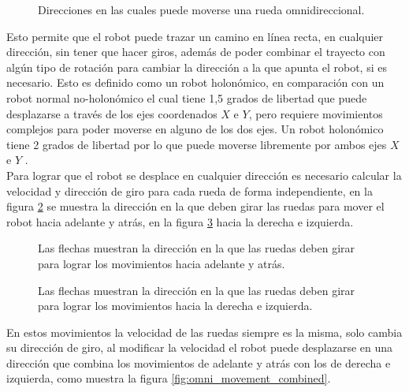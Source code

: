 \documentclass{iccmemoria}
\begin{document}
\begin{figure}[H]
  \centering
  
  \caption{Direcciones en las cuales puede moverse una rueda omnidireccional.}
  \label{fig:image_omni_whell}
\end{figure}


Esto permite que el robot puede trazar un camino en línea recta, en cualquier dirección, sin tener que hacer giros, además de poder combinar el trayecto con algún tipo de rotación para cambiar la dirección a la que apunta el robot, si es necesario. Esto es definido como un robot holonómico, en comparación con un robot normal no-holonómico el cual tiene 1,5 grados de libertad que puede desplazarse a través de los ejes coordenados $X$ e $Y$, pero requiere movimientos complejos para poder moverse en alguno de los dos ejes. Un robot holonómico tiene 2 grados de libertad por lo que puede moverse libremente por ambos ejes $X$ e $Y$ \cite{jayakody2015omnirobot}.\\

Para lograr que el robot se desplace en cualquier dirección es necesario calcular la velocidad y dirección de giro para cada rueda de forma independiente, en la figura \ref{fig:omni_movement_up_down} se muestra la dirección en la que deben girar las ruedas para mover el robot hacia adelante y atrás, en la figura \ref{fig:omni_movement_left_right} hacia la derecha e izquierda.

\begin{figure}[H]
  \centering
  \begin{footnotesize}
  
  \end{footnotesize}
  \caption{Las flechas muestran la dirección en la que las ruedas deben girar para lograr los movimientos hacia adelante y atrás.}
  \label{fig:omni_movement_up_down}
\end{figure}

\begin{figure}[H]
  \centering
  \begin{footnotesize}
  
  \end{footnotesize}
  \caption{Las flechas muestran la dirección en la que las ruedas deben girar para lograr los movimientos hacia la derecha e izquierda.}
  \label{fig:omni_movement_left_right}
\end{figure}

En estos movimientos la velocidad de las ruedas siempre es la misma, solo cambia su dirección de giro, al modificar la velocidad el robot puede desplazarse en una dirección que combina los movimientos de adelante y atrás con los de derecha e izquierda, como muestra la figura \ref{fig:omni_movement_combined}.
\end{document}

